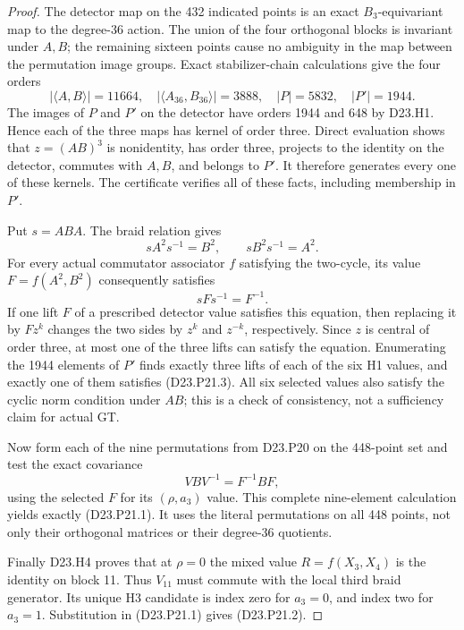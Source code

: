 \begin{proof}
The detector map on the 432 indicated points is an exact
$B_3$-equivariant map to the degree-36 action. The union
of the four orthogonal blocks is invariant under $A,B$;
the remaining sixteen points cause no ambiguity in the
map between the permutation image groups. Exact
stabilizer-chain calculations give the four orders
\[
 |\langle A,B\rangle|=11664,\quad
 |\langle A_{36},B_{36}\rangle|=3888,\quad
 |P|=5832,\quad |P'|=1944.
\]
The images of $P$ and $P'$ on the detector have orders
1944 and 648 by D23.H1. Hence each of the three maps
has kernel of order three. Direct evaluation shows that
$z=(AB)^3$ is nonidentity, has order three, projects to
the identity on the detector, commutes with $A,B$, and
belongs to $P'$. It therefore generates every one of
these kernels. The certificate verifies all of these
facts, including membership in $P'$.

Put $s=ABA$. The braid relation gives
\[
        sA^2s^{-1}=B^2,\qquad sB^2s^{-1}=A^2.
\]
For every actual commutator associator $f$ satisfying
the two-cycle, its value $F=f(A^2,B^2)$ consequently
satisfies
\[
                         sFs^{-1}=F^{-1}.                 \tag{D23.P21.3}
\]
If one lift $F$ of a prescribed detector value satisfies
this equation, then replacing it by $Fz^k$ changes the
two sides by $z^k$ and $z^{-k}$, respectively. Since
$z$ is central of order three, at most one of the three
lifts can satisfy the equation. Enumerating the 1944
elements of $P'$ finds exactly three lifts of each of
the six H1 values, and exactly one of them satisfies
(D23.P21.3). All six selected values also satisfy the
cyclic norm condition under $AB$; this is a check of
consistency, not a sufficiency claim for actual GT.

Now form each of the nine permutations from D23.P20
on the 448-point set and test the exact covariance
\[
                     VBV^{-1}=F^{-1}BF,
\]
using the selected $F$ for its $(\rho,a_3)$ value.
This complete nine-element calculation yields exactly
(D23.P21.1). It uses the literal permutations on all
448 points, not only their orthogonal matrices or their
degree-36 quotients.

Finally D23.H4 proves that at $\rho=0$ the mixed value
$R=f(X_3,X_4)$ is the identity on block 11. Thus $V_{11}$
must commute with the local third braid generator. Its
unique H3 candidate is index zero for $a_3=0$, and
index two for $a_3=1$. Substitution in (D23.P21.1)
gives (D23.P21.2).
\end{proof}

